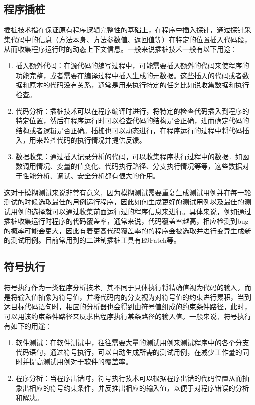 \subsection{程序插桩}

插桩技术指在保证原有程序逻辑完整性的基础上，在程序中插入探针，通过探针采集代码中的信息（方法本身、方法参数值、返回值等）在特定的位置插入代码段，从而收集程序运行时的动态上下文信息。一般来说插桩技术一般有以下用途：

\begin{enumerate}
\item 插入额外代码：在源代码的编写过程中，可能需要插入额外的代码来使程序的功能完整，或者需要在编译过程中插入生成的元数据。这些插入的代码或者数据和原本的代码没有关系，通常是用来执行特定的任务比如说收集数据和执行检查。
\item 代码分析：插桩技术可以在程序编译时进行，将特定的检查代码插入到程序的特定位置，然后在程序运行时可以检查代码的结构是否正确，进而确定代码的结构或者逻辑是否正确。插桩也可以动态进行，在程序运行的过程中将代码插入，用来监控代码的执行情况并提供反馈。
\item 数据收集：通过插入记录分析的代码，可以收集程序执行过程中的数据，如函数调用情况、变量的值变化、代码执行路径、分支执行情况等等，这些数据对于性能分析、调试、安全分析都有很大的作用。
\end{enumerate}

这对于模糊测试来说非常有意义，因为模糊测试需要重复生成测试用例并在每一轮测试的时候选取最佳的用例运行程序，因此如何生成更好的测试用例以及最佳的测试用例的选择就可以通过收集前面运行过的程序信息来进行。具体来说，例如通过插桩收集运行时程序的代码覆盖率，通常来说，代码覆盖率越高，相应检测到bug的概率可能会更大，因此有着更高代码覆盖率的的程序会被选取并进行变异生成新的测试用例。目前常用到的二进制插桩工具有E9Patch\cite{duck2020binary}等。

\subsection{符号执行}

符号执行\cite{schwartz2010all, cadar2013symbolic}作为一类程序分析技术，其不同于具体执行将精确值视为代码的输入，而是将输入值抽象为符号值，并将代码内的分支视为对符号值的约束进行累积，当到达目标代码语句时，相应的分析器也会得到由符号值组成的约束条件路径，此时，可以用该约束条件路径来反求出程序执行某条路径的输入值。一般来说，符号执行有如下的用途：

\begin{enumerate}
\item 软件测试：在软件测试中，往往需要大量的测试用例来测试程序中的各个分支代码语句，通过符号执行，可以自动生成所需的测试用例，在减少工作量的同时并提高测试用例对于软件的覆盖率。
\item 程序分析：当程序出错时，符号执行技术可以根据程序出错的代码位置从而抽象出相应的符号约束条件，并反推出相应的输入值，以便于对程序错误的分析和解决。
\end{enumerate}

